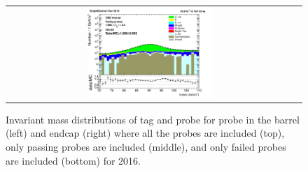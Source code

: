 \begin{figure}[htp]
\begin{center}
\begin{tabular}{cc}
      \includegraphics[width=0.45\textwidth]{figures/Zprime/2016/ScaleFactor/SameSign/nominal/stack_mee_Endcap_fail_PUW.png}
    \end{tabular}
    \caption{Invariant mass distributions of tag and probe for probe in the barrel (left) and endcap (right) where all the probes are included (top), only passing probes are included (middle), and only failed probes are included (bottom) for 2016.}
    \label{fig:SS_nominal_mee_2016}
  \end{center}
\end{figure}

